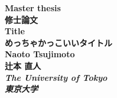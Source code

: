 

%
%
\begin{titlepage}
\thispagestyle{empty}
\begin{spacing}{1.5}
\begin{center}
\vspace*{30truemm}
%
\textbf{\large Master thesis \\ 修士論文}\\
%
\vspace*{20truemm}
%
\textbf{\LARGE Title}\\
\vspace*{5truemm}
{\Large \textbf{めっちゃかっこいいタイトル}}\\
%
\vspace*{50truemm}
%
\textbf{\large Naoto Tsujimoto \\
辻本 直人}\\
\vspace*{10truemm}
\textbf{\textit{The University of Tokyo \\ 東京大学}}

\end{center}
\end{spacing}
\end{titlepage}
%
%
